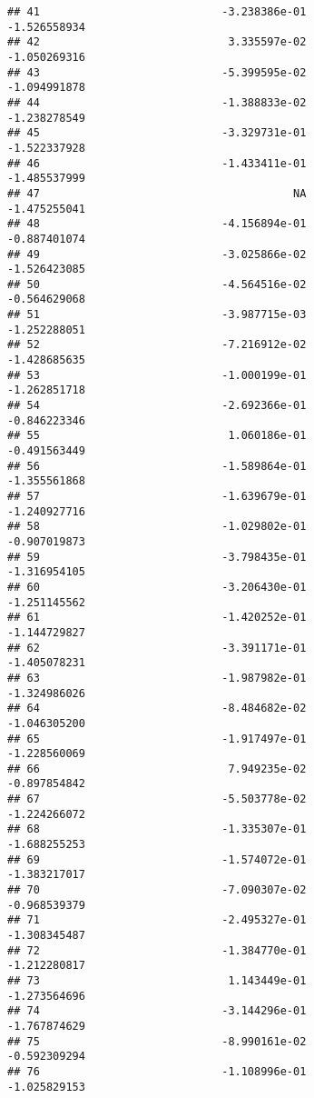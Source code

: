 \documentclass[
]{article}
\begin{document}
\begin{verbatim}
## 41                            -3.238386e-01               -1.526558934
## 42                             3.335597e-02               -1.050269316
## 43                            -5.399595e-02               -1.094991878
## 44                            -1.388833e-02               -1.238278549
## 45                            -3.329731e-01               -1.522337928
## 46                            -1.433411e-01               -1.485537999
## 47                                       NA               -1.475255041
## 48                            -4.156894e-01               -0.887401074
## 49                            -3.025866e-02               -1.526423085
## 50                            -4.564516e-02               -0.564629068
## 51                            -3.987715e-03               -1.252288051
## 52                            -7.216912e-02               -1.428685635
## 53                            -1.000199e-01               -1.262851718
## 54                            -2.692366e-01               -0.846223346
## 55                             1.060186e-01               -0.491563449
## 56                            -1.589864e-01               -1.355561868
## 57                            -1.639679e-01               -1.240927716
## 58                            -1.029802e-01               -0.907019873
## 59                            -3.798435e-01               -1.316954105
## 60                            -3.206430e-01               -1.251145562
## 61                            -1.420252e-01               -1.144729827
## 62                            -3.391171e-01               -1.405078231
## 63                            -1.987982e-01               -1.324986026
## 64                            -8.484682e-02               -1.046305200
## 65                            -1.917497e-01               -1.228560069
## 66                             7.949235e-02               -0.897854842
## 67                            -5.503778e-02               -1.224266072
## 68                            -1.335307e-01               -1.688255253
## 69                            -1.574072e-01               -1.383217017
## 70                            -7.090307e-02               -0.968539379
## 71                            -2.495327e-01               -1.308345487
## 72                            -1.384770e-01               -1.212280817
## 73                             1.143449e-01               -1.273564696
## 74                            -3.144296e-01               -1.767874629
## 75                            -8.990161e-02               -0.592309294
## 76                            -1.108996e-01               -1.025829153

\end{verbatim}
\end{document}
